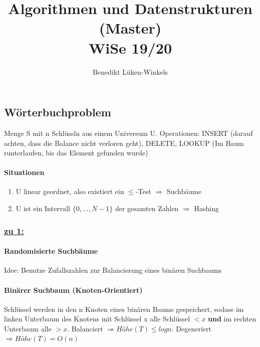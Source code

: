 \documentclass[ngerman]{scrartcl}
\title{Algorithmen und Datenstrukturen (Master) \\ WiSe 19/20}
\author{Benedikt Lüken-Winkels}
\begin{document}
\maketitle
\tableofcontents
\newpage


\subsection*{Wörterbuchproblem}
Menge S mit n Schlüssln aus einem Universum U.
Operationen: INSERT (darauf achten, dass die Balance nicht verloren geht), DELETE, LOOKUP (Im Baum runterlaufen, bis das Element gefunden wurde)
\paragraph{Situationen}
\begin{enumerate}
    \item U linear geordnet, also existiert ein $ \leq $-Test $ \Rightarrow $ Suchbäume
    \item U ist ein Intervall $ \{0,..., N-1\} $ der gesamten Zahlen $ \Rightarrow $ Hashing
\end{enumerate}
\subsubsection*{\underline{zu 1:}}

\paragraph{Randomisierte Suchbäume}
Idee: Benutze Zufallszahlen zur Balancierung eines binären Suchbaums

\paragraph{Binärer Suchbaum (Knoten-Orientiert)}
Schlüssel werden in den n Knoten eines binären Baums gespeichert, sodass im linken Unterbaum des Knotens mit Schlüssel x alle Schlüssel $ < x $ \textbf{und} im rechten Unterbaum alle $ > x $. Balanciert $ \Rightarrow Höhe(T)\leq logn$.  Degeneriert $ \Rightarrow Höhe(T) = O(n)$
\end{document}
